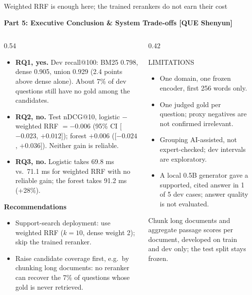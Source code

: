 \documentclass[aspectratio=169,10pt,xcolor=table]{beamer}
\newcommand{\spk}{}
\newcommand{\speakername}{HU Yuyi}
\newcommand{\sect}[1]{{\small\bfseries\color{ink}#1\par}\vspace{2pt}}
\begin{document}
\renewcommand{\speakername}{QUE Shenyun (60269510)}
\renewcommand{\spk}{0:50}
\begin{frame}{Weighted RRF is enough here; the trained rerankers do not earn their cost}
\sect{Part 5: Executive Conclusion \& System Trade-offs [QUE Shenyun]}
\begin{columns}[T,onlytextwidth]
\begin{column}{0.54\textwidth}
\begin{itemize}\setlength{\itemsep}{1pt}
\item \textbf{RQ1, yes.} Dev recall@100: BM25 0.798, dense 0.905, union 0.929 (2.4 points above dense
  alone). About 7\% of dev questions still have no gold among the candidates.
\item \textbf{RQ2, no.} Test nDCG@10, logistic $-$ weighted RRF $=-0.006$ (95\% CI [$-0.023$, $+0.012$]);
  forest $+0.006$ ([$-0.024$, $+0.036$]). Neither gain is reliable.
\item \textbf{RQ3, no.} Logistic takes 69.8 ms vs.\ 71.1 ms for weighted RRF with no reliable gain; the
  forest takes 91.2 ms (+28\%).
\end{itemize}
\vspace{1pt}
\sect{Recommendations}
\begin{itemize}\setlength{\itemsep}{1pt}
\item Support-search deployment: use weighted RRF ($k=10$, dense weight 2); skip the trained reranker.
\item Raise candidate coverage first, e.g.\ by chunking long documents: no reranker can recover the
  7\% of questions whose gold is never retrieved.
\end{itemize}
\end{column}
\begin{column}{0.42\textwidth}
\begin{graybox}{LIMITATIONS}\begin{itemize}\setlength{\itemsep}{0pt}
\item One domain, one frozen encoder, first 256 words only.
\item One judged gold per question; proxy negatives are not confirmed irrelevant.
\item Grouping AI-assisted, not expert-checked; dev intervals are exploratory.
\item A local 0.5B generator gave a supported, cited answer in 1 of 5 dev cases; answer quality is not
  evaluated.
\end{itemize}\end{graybox}
\vspace{1pt}
\begin{takeaway}Chunk long documents and aggregate passage scores per document, developed on
  train and dev only; the test split stays frozen.\end{takeaway}
\end{column}
\end{columns}
\vspace{2pt}
\end{frame}
\end{document}
